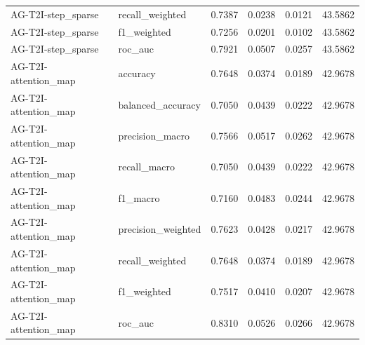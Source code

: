 \begin{tabular}{llrrrr}
AG-T2I-step_sparse & recall_weighted & 0.7387 & 0.0238 & 0.0121 & 43.5862 \\
AG-T2I-step_sparse & f1_weighted & 0.7256 & 0.0201 & 0.0102 & 43.5862 \\
AG-T2I-step_sparse & roc_auc & 0.7921 & 0.0507 & 0.0257 & 43.5862 \\
AG-T2I-attention_map & accuracy & 0.7648 & 0.0374 & 0.0189 & 42.9678 \\
AG-T2I-attention_map & balanced_accuracy & 0.7050 & 0.0439 & 0.0222 & 42.9678 \\
AG-T2I-attention_map & precision_macro & 0.7566 & 0.0517 & 0.0262 & 42.9678 \\
AG-T2I-attention_map & recall_macro & 0.7050 & 0.0439 & 0.0222 & 42.9678 \\
AG-T2I-attention_map & f1_macro & 0.7160 & 0.0483 & 0.0244 & 42.9678 \\
AG-T2I-attention_map & precision_weighted & 0.7623 & 0.0428 & 0.0217 & 42.9678 \\
AG-T2I-attention_map & recall_weighted & 0.7648 & 0.0374 & 0.0189 & 42.9678 \\
AG-T2I-attention_map & f1_weighted & 0.7517 & 0.0410 & 0.0207 & 42.9678 \\
AG-T2I-attention_map & roc_auc & 0.8310 & 0.0526 & 0.0266 & 42.9678 \\
\bottomrule
\end{tabular}
